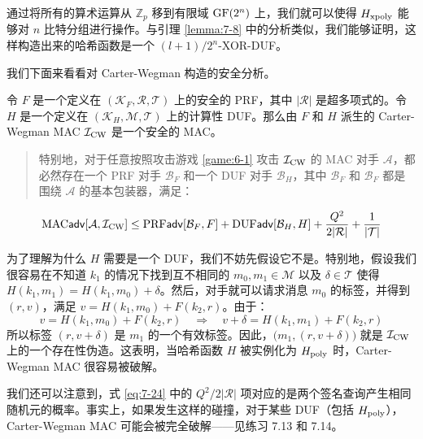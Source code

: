 \begin{remark}\label{remark:7-4}
通过将所有的算术运算从 $\mathbb{Z}_p$ 移到有限域 ${\rm GF}(2^n)$ 上，我们就可以使得 $H_{\rm xpoly}$ 能够对 $n$ 比特分组进行操作。与引理 \ref{lemma:7-8} 中的分析类似，我们能够证明，这样构造出来的哈希函数是一个 ${(l+1)}/{2^n}$-XOR-DUF。
\end{remark}

我们下面来看看对 Carter-Wegman 构造的安全分析。

\begin{theorem}\label{theo:7-9}
令 $F$ 是一个定义在 $(\mathcal{K}_F,\mathcal{R},\mathcal{T})$ 上的安全的 PRF，其中 $|\mathcal{R}|$ 是超多项式的。令 $H$ 是一个定义在 $(\mathcal{K}_H,\mathcal{M},\mathcal{T})$ 上的计算性 DUF。那么由 $F$ 和 $H$ 派生的 Carter-Wegman MAC $\mathcal{I}_{\rm CW}$ 是一个安全的 MAC。
\begin{quote}
特别地，对于任意按照攻击游戏 \ref{game:6-1} 攻击 $\mathcal{I}_{\rm CW}$ 的 MAC 对手 $\mathcal{A}$，都必然存在一个 PRF 对手 $\mathcal{B}_F$ 和一个 DUF 对手 $\mathcal{B}_H$，其中 $\mathcal{B}_F$ 和 $\mathcal{B}_F$ 都是围绕 $\mathcal{A}$ 的基本包装器，满足：
\end{quote}
\begin{equation}\label{eq:7-24}
{\rm MAC}\mathsf{adv}[\mathcal{A}, \mathcal{I}_{\rm CW}]\leq{\rm PRF}\mathsf{adv}[\mathcal{B}_F,F]+{\rm DUF}\mathsf{adv}[\mathcal{B}_H,H]+\frac{Q^2}{2|\mathcal{R}|}+\frac{1}{|\mathcal{T}|}
\end{equation}
\end{theorem}

\begin{remark}\label{remark:7-5}
为了理解为什么 $H$ 需要是一个 DUF，我们不妨先假设它不是。特别地，假设我们很容易在不知道 $k_1$ 的情况下找到互不相同的 $m_0,m_1\in\mathcal{M}$ 以及 $\delta\in\mathcal{T}$ 使得 $H(k_1,m_1)=H(k_1,m_0)+\delta$。然后，对手就可以请求消息 $m_0$ 的标签，并得到 $(r,v)$，满足 $v=H(k_1,m_0)+F(k_2,r)$。由于：
\[
v=H(k_1,m_0)+F(k_2,r)
\quad\Longrightarrow\quad
v+\delta=H(k_1,m_1)+F(k_2,r)
\]
所以标签 $(r,v+\delta)$ 是 $m_1$ 的一个有效标签。因此，$\big(m_1,(r,v+\delta)\big)$ 就是 $\mathcal{I}_{\rm CW}$ 上的一个存在性伪造。这表明，当哈希函数 $H$ 被实例化为 $H_{\rm poly}$ 时，Carter-Wegman MAC 很容易被破解。
\end{remark}

\begin{remark}\label{remark:7-6}
我们还可以注意到，式 \ref{eq:7-24} 中的 ${Q^2}/{2|\mathcal{R}|}$ 项对应的是两个签名查询产生相同随机元的概率。事实上，如果发生这样的碰撞，对于某些 DUF（包括 $H_{\rm poly}$），Carter-Wegman MAC 可能会被完全破解——见练习 7.13 和 7.14。
\end{remark}

